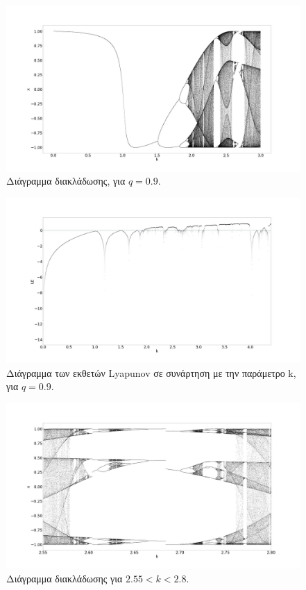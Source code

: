 \begin{figure}[ht]
	\centering
	\includegraphics[width=1\linewidth]{LateX images/cheb q=0.9/g1}
	\caption{Διάγραμμα διακλάδωσης, για $q=0.9$.}
	\label{f:g65}
\end{figure}


\begin{figure}[ht]
	\centering
	\includegraphics[width=1\linewidth]{LateX images/cheb q=0.9/g2}
	\caption{Διάγραμμα των εκθετών Lyapunov σε συνάρτηση με την παράμετρο k, για $q=0.9$.}
	\label{f:g66}
\end{figure}


\begin{figure}[ht]
	\centering
	\includegraphics[width=\textwidth]{LateX images/cheb q=0.9/g3}
	\caption{Διάγραμμα διακλάδωσης για $2.55<k<2.8$. }
	\label{f:g67}
\end{figure}

